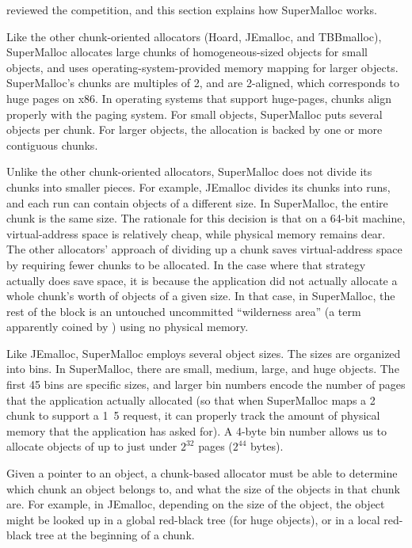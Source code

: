 \documentclass[natbib,sort&compress,10pt]{sigplanconf}
\begin{document}

 reviewed the competition, and this section explains how
SuperMalloc works.   

Like the other chunk-oriented allocators (Hoard, JEmalloc, and
TBBmalloc), SuperMalloc allocates large chunks of homogeneous-sized
objects for small objects, and uses operating-system-provided memory
mapping for larger objects.  SuperMalloc's chunks are multiples of
\unit{2}\mebi\byte, and are \unit{2}\mebi\byte{}-aligned, which
corresponds to huge pages on x86.  In operating systems that support
huge-pages, chunks align properly with the paging system.  For small
objects, SuperMalloc puts several objects per chunk.  For larger
objects, the allocation is backed by one or more contiguous chunks.

Unlike the other chunk-oriented allocators, SuperMalloc does not
divide its chunks into smaller pieces.  For example, JEmalloc divides
its chunks into runs, and each run can contain objects of a different
size.  In SuperMalloc, the entire chunk is the same size.  The
rationale for this decision is that on a 64-bit machine,
virtual-address space is relatively cheap, while physical memory
remains dear.  The other allocators' approach of dividing up a chunk
saves virtual-address space by requiring fewer chunks to be allocated.
In the case where that strategy actually does save space, it is
because the application did not actually allocate a whole chunk's
worth of objects of a given size.  In that case, in SuperMalloc, the
rest of the block is an untouched uncommitted ``wilderness area'' (a
term apparently coined by \cite{KornVo85}) using no physical memory.



Like JEmalloc, SuperMalloc employs several object sizes.  The sizes
are organized into bins.  In SuperMalloc, there are small, medium,
large, and huge objects.  The first 45 bins are specific sizes, and
larger bin numbers encode the number of pages that the application
actually allocated (so that when SuperMalloc maps a
\unit{2}\mebi\byte{} chunk to support a \unit{1.5}\mebi\byte{}
request, it can properly track the amount of physical memory that the
application has asked for).  A 4-byte bin number allows us to allocate
objects of up to just under $2^{32}$ pages ($2^{44}$ bytes).

Given a pointer to an object, a chunk-based allocator must be able to
determine which chunk an object belongs to, and what the size of the
objects in that chunk are.  For example, in JEmalloc, depending on the
size of the object, the object might be looked up in a global
red-black tree (for huge objects), or in a local red-black tree at the
beginning of a chunk.
\end{document}
